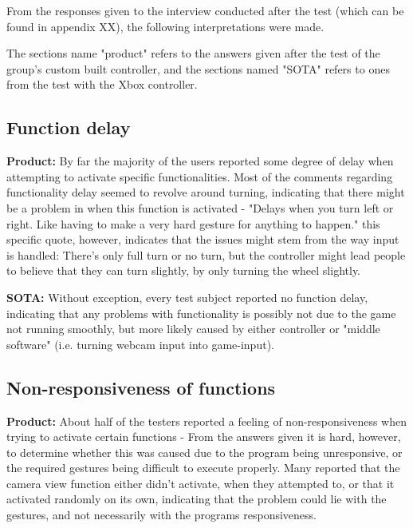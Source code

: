 From the responses given to the interview conducted after the test (which can be found in appendix XX), the following interpretations were made.

The sections name "product" refers to the answers given after the test of the group's custom built controller, and the sections named "SOTA" refers to ones from the test with the Xbox controller.

\subsection*{Function delay}
\noindent\textbf{Product: }\newline
By far the majority of the users reported some degree of delay when attempting to activate specific functionalities. Most of the comments regarding functionality delay seemed to revolve around turning, indicating that there might be a problem in when this function is activated - "Delays when you turn left or right. Like having to make a very hard gesture for anything to happen." this specific quote, however, indicates that the issues might stem from the way input is handled: There's only full turn or no turn, but the controller might lead people to believe that they can turn slightly, by only turning the wheel slightly.
\bigskip

\noindent\textbf{SOTA:}\newline
Without exception, every test subject reported no function delay, indicating that any problems with functionality is possibly not due to the game not running smoothly, but more likely caused by either controller or "middle software" (i.e. turning webcam input into game-input).


\subsection*{Non-responsiveness of functions}
\noindent\textbf{Product: }\newline
About half of the testers reported a feeling of non-responsiveness when trying to activate certain functions - From the answers given it is hard, however, to determine whether this was caused due to the program being unresponsive, or the required gestures being difficult to execute properly. Many reported that the camera view function either didn't activate, when they attempted to, or that it activated randomly on its own, indicating that the problem could lie with the gestures, and not necessarily with the programs responsiveness.
\bigskip

